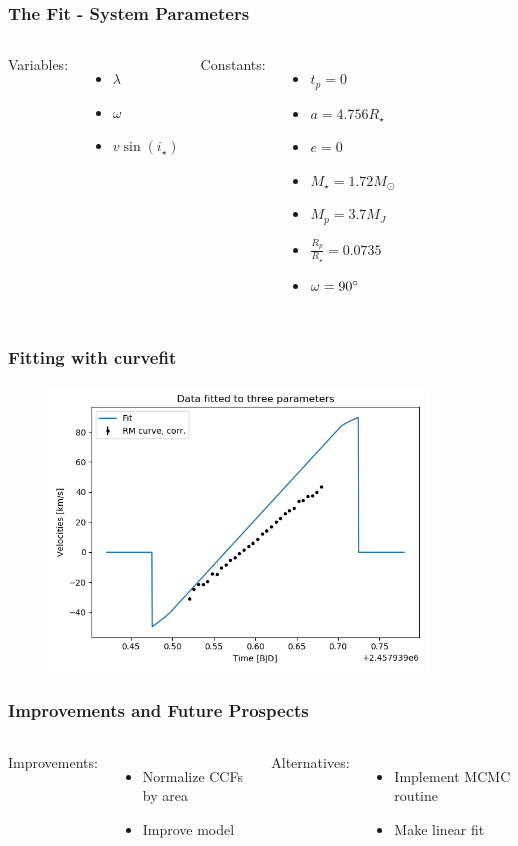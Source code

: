 \documentclass[show notes]{beamer}
\begin{document}
\begin{frame}
\frametitle{The Fit - System Parameters}
\begin{columns}
	Variables:
	\begin{itemize}
	\item $\lambda$
	\item $\omega$
	\item $v \sin(i_\star)$
	\end{itemize}
	Constants:
	\begin{itemize}
	\item $t_p = 0$
	\item $a = 4.756 R_\star$
	\item $e = 0$
	\item $M_\star = 1.72 M_\odot$
	\item $M_p = 3.7 M_J$
	\item $\frac{R_p}{R_\star} = 0.0735$
	\item $\omega = 90 \degree$
	\end{itemize}
\end{columns}
\end{frame}

\begin{frame}
\frametitle{Fitting with curvefit}
\begin{figure}
\centering
\includegraphics[width=0.9\textwidth]{../figures/curve_fit_rmcurve.png}
\end{figure}
\end{frame}

\begin{frame}
\frametitle{Improvements and Future Prospects}
\begin{columns}
	Improvements:
	\begin{itemize}
	\item Normalize CCFs by area
	\item Improve model
	\end{itemize}
	
	Alternatives:
	\begin{itemize}
	\item Implement MCMC routine
	\item Make linear fit
	\end{itemize}
\end{columns}
\end{frame}

\begin{frame}

\end{frame}
\end{document}
